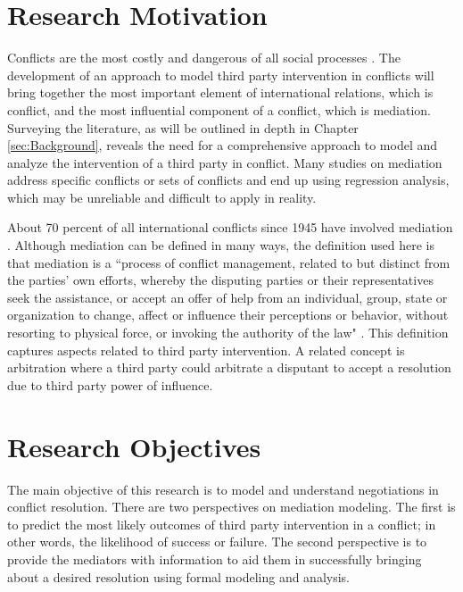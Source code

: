 \documentclass[letterpaper,12pt,titlepage,oneside,final]{book}
\begin{document}
\section{Research Motivation}
Conflicts are the most costly and dangerous of all social processes \cite{bercovitch2009}. The development of an approach to model third party intervention in conflicts will bring together the most important element of international relations, which is conflict, and the most influential component of a conflict, which is mediation.
Surveying the literature, as will be outlined in depth in Chapter \ref{sec:Background}, reveals the need for a comprehensive approach to model and analyze the intervention of a third party in conflict. Many studies on mediation address specific conflicts or sets of conflicts and end up using regression analysis, which may be unreliable and difficult to apply in reality.


About 70 percent of all international conflicts since 1945 have involved mediation . Although mediation can be defined in many ways, the definition used here is that mediation is a ``process of conflict management, related to but distinct from the parties' own efforts, whereby the disputing parties or their representatives seek the assistance, or accept an offer of help from an individual, group, state or organization to change, affect or influence their perceptions or behavior, without resorting to physical force, or invoking the authority of the law" \citep{bercovitch1992}. This definition captures aspects related to third party intervention. A related concept is arbitration where a third party could arbitrate a disputant to accept a resolution due to third party power of influence.


\section{Research Objectives}


The main objective of this research is to model and understand negotiations in conflict resolution. There are two perspectives on mediation modeling. The first is to predict the most likely outcomes of third party intervention in a conflict; in other words, the likelihood of success or failure. The second perspective is to provide the mediators with information to aid them in successfully bringing about a desired resolution using formal modeling and analysis.
\end{document}
